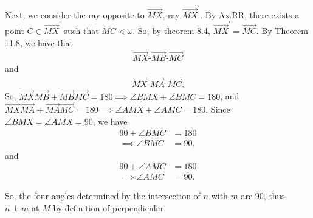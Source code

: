\documentclass{report}
\begin{document}
    Next, we consider the ray opposite to $\overrightarrow{MX}$, ray $\overrightarrow{MX}^{\prime}$. By Ax.RR, there exists a point $C\in \overrightarrow{MX}^{\prime}$ such that $MC < \omega$. So, by theorem 8.4, $\overrightarrow{MX}^{\prime} = \overrightarrow{MC}$. By Theorem 11.8, we have that
    \begin{align*}
        \overrightarrow{MX}\text{-}\overrightarrow{MB}\text{-}\overrightarrow{MC}
    \end{align*}
    and
    \begin{align*}
        \overrightarrow{MX}\text{-}\overrightarrow{MA}\text{-}\overrightarrow{MC}
    .\end{align*}
    So, $ \overrightarrow{MX}\overrightarrow{MB} + \overrightarrow{MB}\overrightarrow{MC} = 180 \implies \angle BMX + \angle BMC = 180$, and $ \overrightarrow{MX}\overrightarrow{MA} + \overrightarrow{MA}\overrightarrow{MC} = 180 \implies \angle AMX + \angle AMC = 180$. Since $ \angle BMX = \angle AMX =90$, we have
    \begin{align*}
        90 + \angle BMC &= 180\\
        \implies \angle BMC &= 90, 
    \end{align*}
    and 
    \begin{align*}
        90 + \angle AMC &= 180 \\
        \implies \angle AMC &= 90
    .\end{align*}
    \bigbreak \noindent 
    \begin{figure}[ht]
        \centering
        \label{fig:tri3}
    \end{figure}
    \bigbreak \noindent 
    So, the four angles determined by the intersection of $n$ with $m$ are $90$, thus $n \perp m$ at $M$ by definition of perpendicular. \endpf
\end{document}
